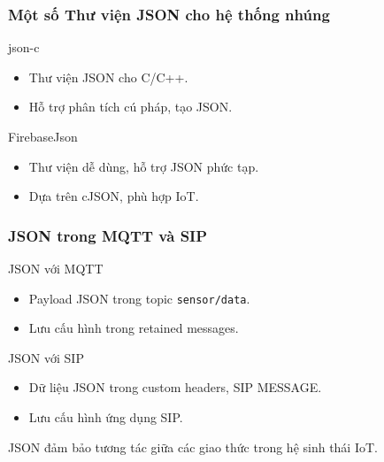 \begin{frame}
\frametitle{Một số Thư viện JSON cho hệ thống nhúng}

\begin{block}{json-c}
\begin{itemize}
\item Thư viện JSON cho C/C++.
\item Hỗ trợ phân tích cú pháp, tạo JSON.
\end{itemize}
\end{block}

\begin{block}{FirebaseJson}
\begin{itemize}
\item Thư viện dễ dùng, hỗ trợ JSON phức tạp.
\item Dựa trên cJSON, phù hợp IoT.
\end{itemize}
\end{block}
\end{frame}

\begin{frame}
\frametitle{JSON trong MQTT và SIP}
\begin{block}{JSON với MQTT}
\begin{itemize}
\item Payload JSON trong topic \texttt{sensor/data}.
\item Lưu cấu hình trong retained messages.
\end{itemize}
\end{block}

\begin{block}{JSON với SIP}
\begin{itemize}
\item Dữ liệu JSON trong custom headers, SIP MESSAGE.
\item Lưu cấu hình ứng dụng SIP.
\end{itemize}
\end{block}

\begin{block}
JSON đảm bảo tương tác giữa các giao thức trong hệ sinh thái IoT.
\end{block}
\end{frame}


